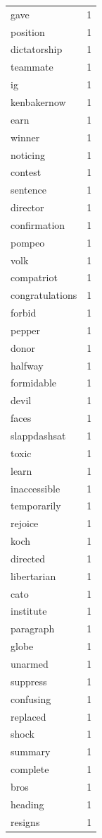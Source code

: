 \begin{tabular}{lr}
gave & 1 \\
position & 1 \\
dictatorship & 1 \\
teammate & 1 \\
ig & 1 \\
kenbakernow & 1 \\
earn & 1 \\
winner & 1 \\
noticing & 1 \\
contest & 1 \\
sentence & 1 \\
director & 1 \\
confirmation & 1 \\
pompeo & 1 \\
volk & 1 \\
compatriot & 1 \\
congratulations & 1 \\
forbid & 1 \\
pepper & 1 \\
donor & 1 \\
halfway & 1 \\
formidable & 1 \\
devil & 1 \\
faces & 1 \\
slappdashsat & 1 \\
toxic & 1 \\
learn & 1 \\
inaccessible & 1 \\
temporarily & 1 \\
rejoice & 1 \\
koch & 1 \\
directed & 1 \\
libertarian & 1 \\
cato & 1 \\
institute & 1 \\
paragraph & 1 \\
globe & 1 \\
unarmed & 1 \\
suppress & 1 \\
confusing & 1 \\
replaced & 1 \\
shock & 1 \\
summary & 1 \\
complete & 1 \\
bros & 1 \\
heading & 1 \\
resigns & 1 \\

\end{tabular}
